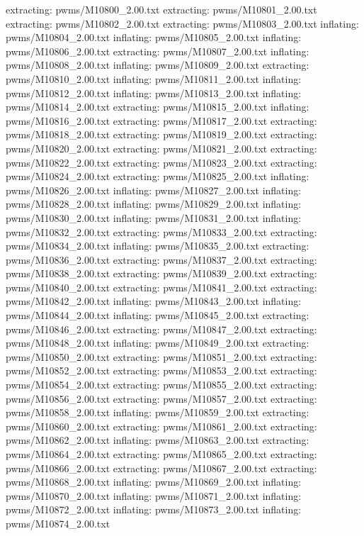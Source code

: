 \documentclass[letterpaper,10pt,english]{sphinxmanual}
\begin{document}
{\begin{sphinxVerbatim}[commandchars=\\\{\}]
 extracting: pwms/M10800\_2.00.txt
 extracting: pwms/M10801\_2.00.txt
 extracting: pwms/M10802\_2.00.txt
 extracting: pwms/M10803\_2.00.txt
  inflating: pwms/M10804\_2.00.txt
  inflating: pwms/M10805\_2.00.txt
  inflating: pwms/M10806\_2.00.txt
 extracting: pwms/M10807\_2.00.txt
  inflating: pwms/M10808\_2.00.txt
  inflating: pwms/M10809\_2.00.txt
 extracting: pwms/M10810\_2.00.txt
  inflating: pwms/M10811\_2.00.txt
  inflating: pwms/M10812\_2.00.txt
  inflating: pwms/M10813\_2.00.txt
  inflating: pwms/M10814\_2.00.txt
 extracting: pwms/M10815\_2.00.txt
  inflating: pwms/M10816\_2.00.txt
 extracting: pwms/M10817\_2.00.txt
 extracting: pwms/M10818\_2.00.txt
 extracting: pwms/M10819\_2.00.txt
 extracting: pwms/M10820\_2.00.txt
 extracting: pwms/M10821\_2.00.txt
 extracting: pwms/M10822\_2.00.txt
 extracting: pwms/M10823\_2.00.txt
 extracting: pwms/M10824\_2.00.txt
 extracting: pwms/M10825\_2.00.txt
  inflating: pwms/M10826\_2.00.txt
  inflating: pwms/M10827\_2.00.txt
  inflating: pwms/M10828\_2.00.txt
  inflating: pwms/M10829\_2.00.txt
  inflating: pwms/M10830\_2.00.txt
  inflating: pwms/M10831\_2.00.txt
  inflating: pwms/M10832\_2.00.txt
 extracting: pwms/M10833\_2.00.txt
 extracting: pwms/M10834\_2.00.txt
  inflating: pwms/M10835\_2.00.txt
 extracting: pwms/M10836\_2.00.txt
 extracting: pwms/M10837\_2.00.txt
 extracting: pwms/M10838\_2.00.txt
 extracting: pwms/M10839\_2.00.txt
 extracting: pwms/M10840\_2.00.txt
 extracting: pwms/M10841\_2.00.txt
 extracting: pwms/M10842\_2.00.txt
  inflating: pwms/M10843\_2.00.txt
  inflating: pwms/M10844\_2.00.txt
  inflating: pwms/M10845\_2.00.txt
 extracting: pwms/M10846\_2.00.txt
 extracting: pwms/M10847\_2.00.txt
 extracting: pwms/M10848\_2.00.txt
  inflating: pwms/M10849\_2.00.txt
 extracting: pwms/M10850\_2.00.txt
 extracting: pwms/M10851\_2.00.txt
 extracting: pwms/M10852\_2.00.txt
 extracting: pwms/M10853\_2.00.txt
 extracting: pwms/M10854\_2.00.txt
 extracting: pwms/M10855\_2.00.txt
 extracting: pwms/M10856\_2.00.txt
 extracting: pwms/M10857\_2.00.txt
 extracting: pwms/M10858\_2.00.txt
  inflating: pwms/M10859\_2.00.txt
 extracting: pwms/M10860\_2.00.txt
 extracting: pwms/M10861\_2.00.txt
 extracting: pwms/M10862\_2.00.txt
  inflating: pwms/M10863\_2.00.txt
 extracting: pwms/M10864\_2.00.txt
 extracting: pwms/M10865\_2.00.txt
 extracting: pwms/M10866\_2.00.txt
 extracting: pwms/M10867\_2.00.txt
 extracting: pwms/M10868\_2.00.txt
  inflating: pwms/M10869\_2.00.txt
  inflating: pwms/M10870\_2.00.txt
  inflating: pwms/M10871\_2.00.txt
  inflating: pwms/M10872\_2.00.txt
  inflating: pwms/M10873\_2.00.txt
  inflating: pwms/M10874\_2.00.txt

\end{sphinxVerbatim}}
\end{document}
